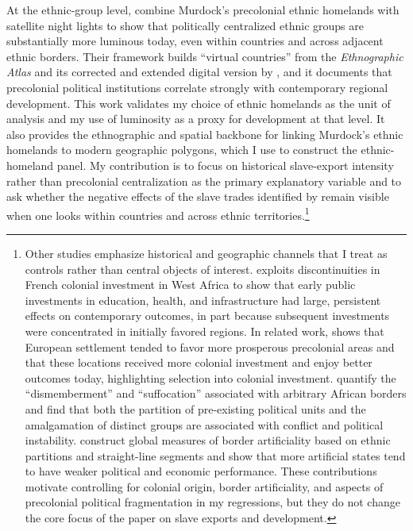 \documentclass[12pt]{article}
\begin{document}
At the ethnic-group level, \citet{michalopoulospapaioannou2013} combine Murdock's precolonial ethnic homelands with satellite night lights to show that politically centralized ethnic groups are substantially more luminous today, even within countries and across adjacent ethnic borders. Their framework builds ``virtual countries'' from the \citet{murdock1967} \emph{Ethnographic Atlas} and its corrected and extended digital version by \citet{gray1999}, and it documents that precolonial political institutions correlate strongly with contemporary regional development. This work validates my choice of ethnic homelands as the unit of analysis and my use of luminosity as a proxy for development at that level. It also provides the ethnographic and spatial backbone for linking Murdock's ethnic homelands to modern geographic polygons, which I use to construct the ethnic-homeland panel. My contribution is to focus on historical slave-export intensity rather than precolonial centralization as the primary explanatory variable and to ask whether the negative effects of the slave trades identified by \citet{nunn2008} remain visible when one looks within countries and across ethnic territories.\footnote{Other studies emphasize historical and geographic channels that I treat as controls rather than central objects of interest. \citet{huillery2009} exploits discontinuities in French colonial investment in West Africa to show that early public investments in education, health, and infrastructure had large, persistent effects on contemporary outcomes, in part because subsequent investments were concentrated in initially favored regions. In related work, \citet{huillery2011} shows that European settlement tended to favor more prosperous precolonial areas and that these locations received more colonial investment and enjoy better outcomes today, highlighting selection into colonial investment. \citet{englebert2002} quantify the ``dismemberment'' and ``suffocation'' associated with arbitrary African borders and find that both the partition of pre-existing political units and the amalgamation of distinct groups are associated with conflict and political instability. \citet{alesina2011} construct global measures of border artificiality based on ethnic partitions and straight-line segments and show that more artificial states tend to have weaker political and economic performance. These contributions motivate controlling for colonial origin, border artificiality, and aspects of precolonial political fragmentation in my regressions, but they do not change the core focus of the paper on slave exports and development.}
\end{document}
